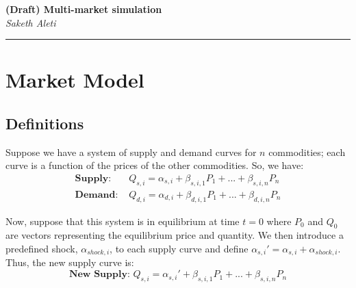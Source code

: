 \documentclass[12pt]{article}
\begin{document}
\begin{center}
 	\Large\textbf{(Draft) Multi-market simulation}\\
 	\large\textit{Saketh Aleti}
\end{center}
\rule{\textwidth}{1pt}

	
\section{Market Model}	

\subsection{Definitions}

Suppose we have a system of supply and demand curves for $n$ commodities; each curve is a function of the prices of the other commodities. So, we have:
\begin{subequations}
\begin{align}
\textbf{Supply: } & Q_{s,i} = \alpha_{s,i} + \beta_{s,i,1} P_1 + ... + \beta_{s,i,n} P_n				\\
\textbf{Demand: } & Q_{d,i} = \alpha_{d,i} + \beta_{d,i,1} P_1 + ... + \beta_{d,i,n} P_n	
\end{align}
\end{subequations}

Now, suppose that this system is in equilibrium at time $t = 0$ where $P_0$ and $Q_0$ are vectors representing the equilibrium price and quantity. We then introduce a predefined shock, ${\alpha_{shock,i}} $, to each supply curve and define $ \alpha_{s,i}' = {\alpha_{s,i}}+ {\alpha_{shock,i}} $. Thus, the new supply curve is: 
\begin{equation}
\textbf{New Supply: }  Q_{s,i} = \alpha_{s,i}' + \beta_{s,i,1} P_1 + ... + \beta_{s,i,n} P_n  \tag{1c}
\end{equation}
\end{document}
